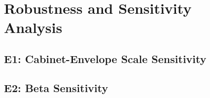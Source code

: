
\section{Robustness and Sensitivity Analysis}
\label{sec:robustness}

\subsection{E1: Cabinet-Envelope Scale Sensitivity}

\subsection{E2: Beta Sensitivity}

